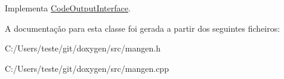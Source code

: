 Implementa \hyperlink{class_code_output_interface_a4ab86013abbf61a86e9c300eb805939a}{Code\-Output\-Interface}.



A documentação para esta classe foi gerada a partir dos seguintes ficheiros\-:\begin{DoxyCompactItemize}
\item 
C\-:/\-Users/teste/git/doxygen/src/mangen.\-h\item 
C\-:/\-Users/teste/git/doxygen/src/mangen.\-cpp\end{DoxyCompactItemize}
